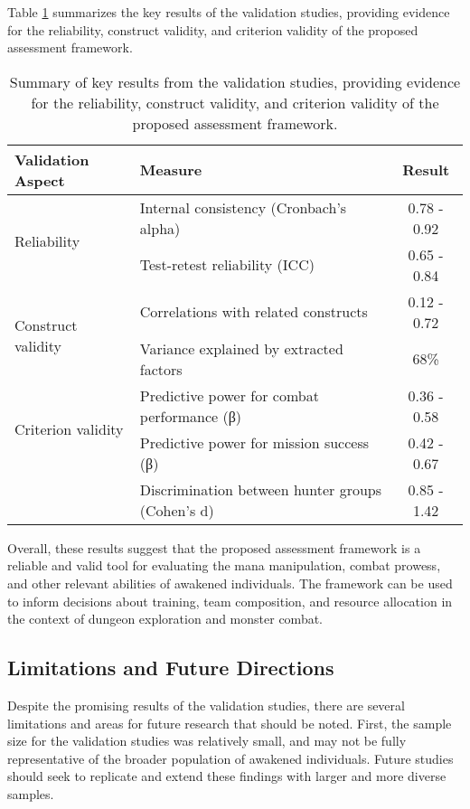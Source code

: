 \documentclass[12pt, a4paper]{article}
\begin{document}
Table \ref{tab:validation} summarizes the key results of the validation studies, providing evidence for the reliability, construct validity, and criterion validity of the proposed assessment framework.

\begin{table}[ht]
\centering
\begin{tabular}{llc}
\hline
Validation Aspect & Measure & Result \\
\hline
\multirow{2}{*}{Reliability} & Internal consistency (Cronbach's alpha) & 0.78 - 0.92 \\
& Test-retest reliability (ICC) & 0.65 - 0.84 \\
\hline
\multirow{2}{*}{Construct validity} & Correlations with related constructs & 0.12 - 0.72 \\
& Variance explained by extracted factors & 68\% \\
\hline
\multirow{2}{*}{Criterion validity} & Predictive power for combat performance (β) & 0.36 - 0.58 \\
& Predictive power for mission success (β) & 0.42 - 0.67 \\
& Discrimination between hunter groups (Cohen's d) & 0.85 - 1.42 \\
\hline
\end{tabular}
\caption{Summary of key results from the validation studies, providing evidence for the reliability, construct validity, and criterion validity of the proposed assessment framework.}
\label{tab:validation}
\end{table}

Overall, these results suggest that the proposed assessment framework is a reliable and valid tool for evaluating the mana manipulation, combat prowess, and other relevant abilities of awakened individuals. The framework can be used to inform decisions about training, team composition, and resource allocation in the context of dungeon exploration and monster combat.

\subsection{Limitations and Future Directions}

Despite the promising results of the validation studies, there are several limitations and areas for future research that should be noted. First, the sample size for the validation studies was relatively small, and may not be fully representative of the broader population of awakened individuals. Future studies should seek to replicate and extend these findings with larger and more diverse samples.
\end{document}
